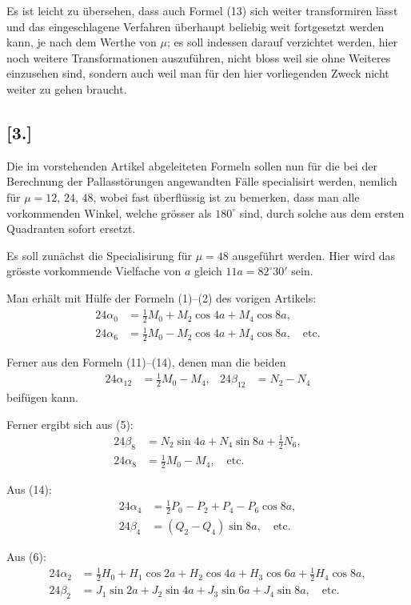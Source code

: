 \documentclass[12pt,a4paper]{article}
\begin{document}
Es ist leicht zu übersehen, dass auch Formel (13) sich weiter transformiren lässt und das eingeschlagene Verfahren überhaupt beliebig weit fortgesetzt werden kann, je nach dem Werthe von $\mu$; es soll indessen darauf verzichtet werden, hier noch weitere Transformationen auszuführen, nicht bloss weil sie ohne Weiteres einzusehen sind, sondern auch weil man für den hier vorliegenden Zweck nicht weiter zu gehen braucht.

\subsection*{[3.]}

Die im vorstehenden Artikel abgeleiteten Formeln sollen nun für die bei der Berechnung der Pallasstörungen angewandten Fälle specialisirt werden, nemlich für $\mu = 12$, $24$, $48$, wobei fast überflüssig ist zu bemerken, dass man alle vorkommenden Winkel, welche grösser als $180^{\circ}$ sind, durch solche aus dem ersten Quadranten sofort ersetzt.

Es soll zunächst die Specialisirung für $\mu = 48$ ausgeführt werden. Hier wird das grösste vorkommende Vielfache von $a$ gleich $11a = 82^{\circ} 30'$ sein.

Man erhält mit Hülfe der Formeln (1)--(2) des vorigen Artikels:
\begin{align*}
24\alpha_0 &= \tfrac{1}{2}M_0 + M_2 \cos 4a + M_4 \cos 8a,\\
24\alpha_6 &= \tfrac{1}{2}M_0 - M_2 \cos 4a + M_4 \cos 8a, \quad \text{etc.}
\end{align*}

Ferner aus den Formeln (11)--(14), denen man die beiden 
\begin{align*}
24\alpha_{12} &= \tfrac{1}{2}M_0 - M_4, & 24\beta_{12} &= N_2 - N_4
\end{align*}
beifügen kann.

Ferner ergibt sich aus (5):
\begin{align*}
24\beta_8 &= N_2 \sin 4a + N_4 \sin 8a + \tfrac{1}{2}N_6,\\
24\alpha_8 &= \tfrac{1}{2}M_0 - M_4, \quad \text{etc.}
\end{align*}

Aus (14):
\begin{align*}
24\alpha_4 &= \tfrac{1}{2}P_0 - P_2 + P_4 - P_6 \cos 8a,\\
24\beta_4 &= (Q_2 - Q_4) \sin 8a, \quad \text{etc.}
\end{align*}

Aus (6):
\begin{align*}
24\alpha_2 &= \tfrac{1}{2}H_0 + H_1 \cos 2a + H_2 \cos 4a + H_3 \cos 6a + \tfrac{1}{2}H_4 \cos 8a,\\
24\beta_2 &= J_1 \sin 2a + J_2 \sin 4a + J_3 \sin 6a + J_4 \sin 8a, \quad \text{etc.}
\end{align*}
\end{document}
